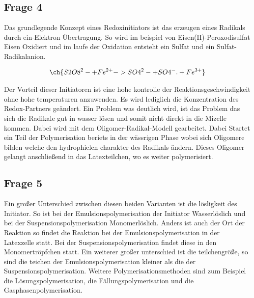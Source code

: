 \documentclass[10pt,a4paper,ngerman]{scrartcl}
\begin{document}
	\subsection{Frage 4}
		
		Das grundlegende Konzept eines Redoxinitiators ist das erzeugen eines Radikals durch ein-Elektron Übertragung.
		So wird im beispiel von Eisen(II)-Peroxodisulfat Eisen Oxidiert und im laufe der Oxidation entsteht ein Sulfat und ein Sulfat-Radikalanion.

			\begin{equation}
				\ch{S2O8^2- + Fe^{2+} -> SO4^2- + SO4^{-}. + Fe^{3+}}
			\end{equation}

		Der Vorteil dieser Initiatoren ist eine hohe kontrolle der Reaktionsgeschwindigkeit ohne hohe temperaturen anzuwenden.
		Es wird lediglich die Konzentration des Redox-Partners geändert.
		Ein Problem was deutlich wird, ist das Problem das sich die Radikale gut in wasser lösen und somit nicht direkt in die Mizelle kommen.
		Dabei wird mit dem Oligomer-Radikal-Modell gearbeitet. Dabei Startet ein Teil der Polymerisation beriets in der wässrigen Phase wobei sich Oligomere bilden welche den 
		hydrophielen charakter des Radikals ändern. 
		Dieses Oligomer gelangt anschließend in das Latexteilchen, wo es weiter polymerisiert.

	\subsection{Frage 5}

		Ein großer Unterschied zwischen diesen beiden Varianten ist die lösligkeit des Initiator.
		So ist bei der Emulsionspolymerisation der Initiator Wasserlöslich und bei der Suspensionspolymerisation Monomerlöslich.
		Anders ist auch der Ort der Reaktion so findet die Reaktion bei der Emulsionspolymerisation in der Latexzelle statt.
		Bei der Suspensionspolymerisation findet diese in den Monomertröpfchen statt.
		Ein weiterer großer unterschied ist die teilchengröße, so sind die teichen der Emulsionspolymerisation kleiner als die der Suspensionspolymerisation.
		Weitere Polymerisationsmethoden sind zum Beispiel die Lösungspolymerisation, die Fällungspolymerisation und die Gasphasenpolymerisation.

\printbibliography
\end{document}
